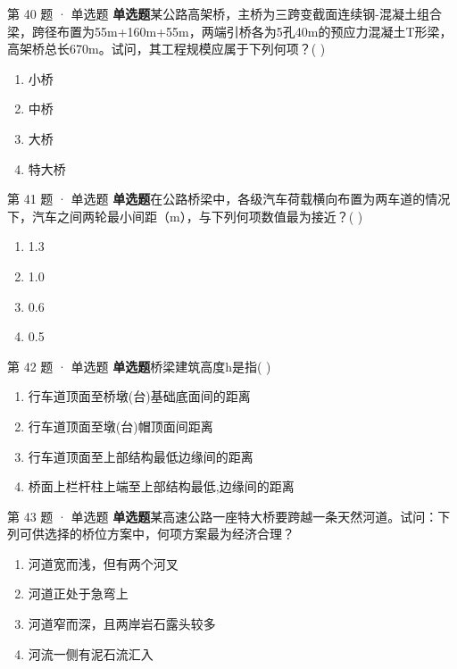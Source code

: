 \documentclass[UTF8,zihao=-4,openany]{ctexbook}
\newenvironment{choices}{\begin{enumerate}[label=\Alph*.,leftmargin=9mm,labelsep=3mm,itemsep=2pt,topsep=4pt]}{\end{enumerate}}
\newcommand{\qtype}[1]{\textcolor{brand}{\sffamily\bfseries #1}}
\begin{document}
\begin{questionbox}{第 40 题 · 单选题}
\qtype{单选题}\quad 某公路高架桥，主桥为三跨变截面连续钢-混凝土组合梁，跨径布置为55m+160m+55m，两端引桥各为5孔40m的预应力混凝土T形梁，高架桥总长670m。试问，其工程规模应属于下列何项？( )
\begin{choices}
\item 小桥
\item 中桥
\item 大桥
\item 特大桥
\end{choices}
\end{questionbox}

\begin{questionbox}{第 41 题 · 单选题}
\qtype{单选题}\quad 在公路桥梁中，各级汽车荷载横向布置为两车道的情况下，汽车之间两轮最小间距（m），与下列何项数值最为接近？( )
\begin{choices}
\item 1.3
\item 1.0
\item 0.6
\item 0.5
\end{choices}
\end{questionbox}

\begin{questionbox}{第 42 题 · 单选题}
\qtype{单选题}\quad 桥梁建筑高度h是指( )
\begin{choices}
\item 行车道顶面至桥墩(台)基础底面间的距离
\item 行车道顶面至墩(台)帽顶面间距离
\item 行车道顶面至上部结构最低边缘间的距离
\item 桥面上栏杆柱上端至上部结构最低,边缘间的距离
\end{choices}
\end{questionbox}

\begin{questionbox}{第 43 题 · 单选题}
\qtype{单选题}\quad 某高速公路一座特大桥要跨越一条天然河道。试问：下列可供选择的桥位方案中，何项方案最为经济合理？
\begin{choices}
\item 河道宽而浅，但有两个河叉
\item 河道正处于急弯上
\item 河道窄而深，且两岸岩石露头较多
\item 河流一侧有泥石流汇入
\end{choices}
\end{questionbox}
\end{document}
